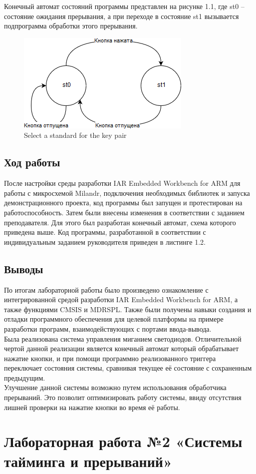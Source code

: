 \documentclass[14pt,a4paper,report]{report}
\begin{document}
Конечный автомат состояний программы представлен на рисунке 1.1, где st0 – состояние ожидания прерывания, а при переходе в состояние st1 вызывается подпрограмма обработки этого прерывания.

\begin{figure}[h!]
	\centering
	\includegraphics[scale = 1]{img/1_1.png}
	\caption{Select a standard for the key pair}
\end{figure}

\section{Ход работы}

После настройки среды разработки IAR Embedded Workbench for ARM для работы с микросхемой Milandr, подключения необходимых библиотек и запуска демонстрационного проекта, код программы был запущен и протестирован на работоспособность. Затем были внесены изменения в соответствии с заданием преподавателя. Для этого был разработан конечный автомат, схема которого приведена выше. 
Код программы, разработанной в соответствии с индивидуальным заданием руководителя приведен в листинге 1.2. 




\section{Выводы}
По итогам лабораторной работы было произведено ознакомление с интегрированной средой разработки IAR Embedded Workbench for ARM, а также функциями CMSIS и MDRSPL. Также были получены навыки создания и отладки программного обеспечения для целевой платформы на примере разработки программ, взаимодействующих с портами ввода-вывода. \\
\indent Была реализована система управления миганием светодиодов. Отличительной чертой данной реализации является конечный автомат который обрабатывает нажатие кнопки, и при помощи программно реализованного триггера переключает состояния системы, сравнивая текущее её состояние с сохраненным предыдущим. \\
\indent Улучшение данной системы возможно путем использования обработчика прерываний. Это позволит оптимизировать работу системы, ввиду отсутствия лишней проверки на нажатие кнопки во время её работы.

\clearpage

\chapter {Лабораторная работа №2 «Системы тайминга и прерываний»}
\end{document}
